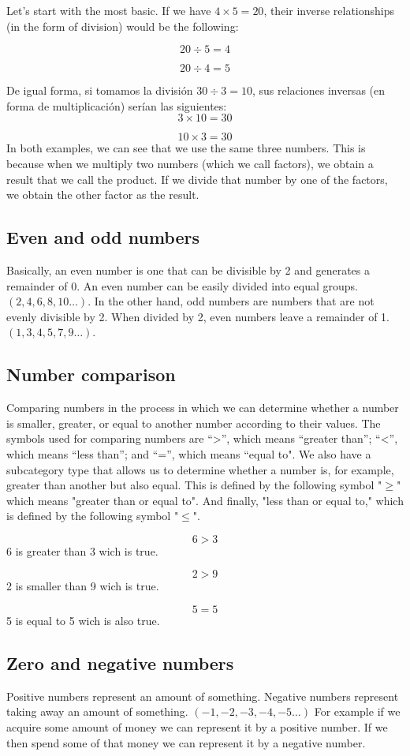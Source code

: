 \documentclass{article} %
\begin{document}
Let's start with the most basic. If we have $4 \times 5 = 20$, their inverse relationships (in the form of division) would be the following:

\[
20 \div 5 = 4
\]

\[
20 \div 4 = 5
\]

De igual forma, si tomamos la división $30 \div 3 = 10$, sus relaciones inversas (en forma de multiplicación) serían las siguientes:
\[
3 \times 10 = 30
\]

\[
10 \times 3 = 30
\]
In both examples, we can see that we use the same three numbers. This is because when we multiply two numbers (which we call factors), we obtain a result that we call the product. If we divide that number by one of the factors, we obtain the other factor as the result.

\subsection{Even and odd numbers}
Basically, an even number is one that can be divisible by 2 and generates a remainder of 0. An even number can be easily divided into equal groups. $(2,4,6,8,10\dots)$.
In the other hand, odd numbers are numbers that are not evenly divisible by 2. When divided by 2, even numbers leave a remainder of 1. $(1,3,4,5,7,9\dots)$.

\subsection{Number comparison}
Comparing numbers in the process in which we can determine whether a number is smaller, greater, or equal to another number according to their values. The symbols used for comparing numbers are “>”, which means “greater than”; “<”, which means “less than”; and “=”, which means “equal to". We also have a subcategory type that allows us to determine whether a number is, for example, greater than another but also equal. This is defined by the following symbol "$\geq$" which means "greater than or equal to". And finally, "less than or equal to," which is defined by the following symbol "$\leq$".

\[
6 > 3
\]
6 is greater than 3 wich is true. 

\[
2 > 9
\]
2 is smaller than 9 wich is true.

\[
5 = 5
\]
5 is equal to 5 wich is also true.

\subsection{Zero and negative numbers}
Positive numbers represent an amount of something. Negative numbers represent taking away an amount of something. $(-1,-2,-3,-4,-5\dots)$ For example if we acquire some amount of money we can represent it by a positive number. If we then spend some of that money we can represent it by a negative number.
\end{document}
